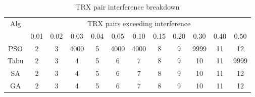 \begin{table}[H]
\centering
	\begin{tabular}{cccccccccccc}
	\toprule
    Alg & \multicolumn{11}{c}{TRX pairs exceeding interference}\\
    & 0.01 & 0.02 & 0.03 & 0.04 & 0.05 & 0.10 & 0.15 & 0.20 & 0.30 & 0.40 & 0.50 \\
    \midrule
    PSO & 2 & 3 & \tiny{4000} & 5 & \small{4000} & \footnotesize{4000} & 8 & 9 & \scriptsize{9999} & 11 & 12\\
    Tabu & 2 & 3 & 4 & 5 & 6 & 7 & 8 & 9 & 10 & 11 & 9999\\
    SA & 2 & 3 & 4 & 5 & 6 & 7 & 8 & 9 & 10 & 11 & 12\\
    GA & 2 & 3 & 4 & 5 & 6 & 7 & 8 & 9 & 10 & 11 & 12\\
    \bottomrule
	\end{tabular}
\caption{TRX pair interference breakdown}
\label{tab:breakdown-siem2m1}
\end{table}


